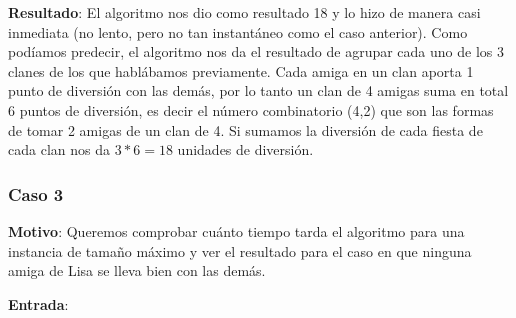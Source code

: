 \textbf{Resultado}: El algoritmo nos dio como resultado 18 y lo hizo de manera casi inmediata (no lento, pero no
 tan instantáneo como el caso anterior). Como podíamos predecir, el algoritmo nos da el resultado de agrupar 
 cada uno de los 3 clanes de los que hablábamos previamente. Cada amiga en un clan aporta 1 punto de diversión 
 con las demás, por lo tanto un clan de 4 amigas suma en total 6 puntos de diversión, es decir el número 
 combinatorio (4,2) que son las formas de tomar 2 amigas de un clan de 4. Si sumamos la diversión de cada fiesta
 de cada clan nos da $3 * 6 = 18$ unidades de diversión.

\subsubsection*{Caso 3}

\textbf{Motivo}: Queremos comprobar cuánto tiempo tarda el algoritmo para una instancia de tamaño máximo y ver el resultado para el caso en que ninguna amiga de Lisa se lleva bien con las demás.

\textbf{Entrada}:

